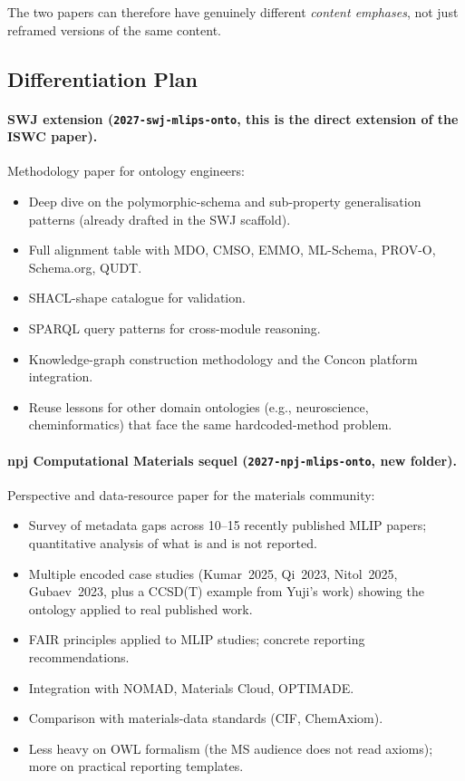 The two papers can therefore have genuinely different \emph{content
emphases}, not just reframed versions of the same content.

\subsection{Differentiation Plan}

\paragraph{SWJ extension (\texttt{2027-swj-mlips-onto}, this is the
direct extension of the ISWC paper).}
Methodology paper for ontology engineers:
\begin{itemize}
\item Deep dive on the polymorphic-schema and sub-property
  generalisation patterns (already drafted in the SWJ scaffold).
\item Full alignment table with MDO, CMSO, EMMO, ML-Schema, PROV-O,
  Schema.org, QUDT.
\item SHACL-shape catalogue for validation.
\item SPARQL query patterns for cross-module reasoning.
\item Knowledge-graph construction methodology and the Concon platform
  integration.
\item Reuse lessons for other domain ontologies (e.g., neuroscience,
  cheminformatics) that face the same hardcoded-method problem.
\end{itemize}

\paragraph{npj Computational Materials sequel
(\texttt{2027-npj-mlips-onto}, new folder).}
Perspective and data-resource paper for the materials community:
\begin{itemize}
\item Survey of metadata gaps across 10--15 recently published MLIP
  papers; quantitative analysis of what is and is not reported.
\item Multiple encoded case studies (Kumar~2025, Qi~2023, Nitol~2025,
  Gubaev~2023, plus a CCSD(T) example from Yuji's work) showing the
  ontology applied to real published work.
\item FAIR principles applied to MLIP studies; concrete reporting
  recommendations.
\item Integration with NOMAD, Materials Cloud, OPTIMADE.
\item Comparison with materials-data standards (CIF, ChemAxiom).
\item Less heavy on OWL formalism (the MS audience does not read
  axioms); more on practical reporting templates.
\end{itemize}

